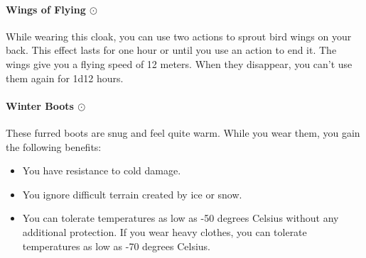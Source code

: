     \paragraph{Wings of Flying $\odot$}
        While wearing this cloak, you can use two actions to sprout bird wings on your back.
        This effect lasts for one hour or until you use an action to end it.
        The wings give you a flying speed of 12 meters.
        When they disappear, you can't use them again for 1d12 hours.
    \paragraph{Winter Boots $\odot$}
        These furred boots are snug and feel quite warm.
        While you wear them, you gain the following benefits:
        \begin{itemize}
            \item You have resistance to cold damage.
            \item You ignore difficult terrain created by ice or snow.
            \item You can tolerate temperatures as low as -50 degrees Celsius without any additional protection.
            If you wear heavy clothes, you can tolerate temperatures as low as -70 degrees Celsius.
        \end{itemize}
\newpage~\newpage
